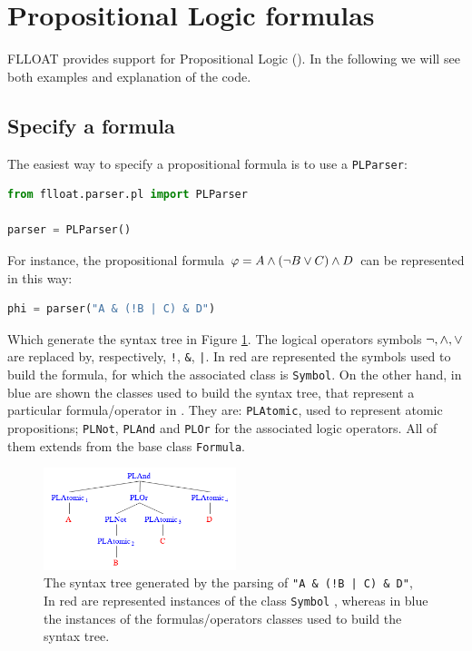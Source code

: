 \section{Propositional Logic formulas}\label{sect:flloat-pl}

FLLOAT provides support for Propositional Logic (\PL). In the following we will see both examples and explanation of the code.

\subsection{Specify a \PL formula}\label{sect:flloat-pl-syntax}
The easiest way to specify a propositional formula is to use a \texttt{PLParser}:

\begin{lstlisting}[language=Python, style=Python]
from flloat.parser.pl import PLParser

parser = PLParser()
\end{lstlisting}
For instance, the propositional formula $\varphi= A \wedge (\lnot B \vee C) \wedge D$ can be represented in this way:

\begin{lstlisting}[language=Python, style=Python]
phi = parser("A & (!B | C) & D")
\end{lstlisting}
Which generate the syntax tree in Figure \ref{fig:pl-formula-example-1-syntax-tree}. The logical operators symbols $\lnot, \wedge, \vee$ are replaced by, respectively, \texttt{!}, \texttt{\&}, \texttt{|}. In red are represented the symbols used to build the formula, for which the associated class is \texttt{Symbol}. On the other hand, in blue are shown the classes used to build the syntax tree, that represent a particular formula/operator in \PL. They are: \texttt{PLAtomic}, used to represent atomic propositions; \texttt{PLNot}, \texttt{PLAnd} and \texttt{PLOr} for the associated logic operators. All of them extends from the base class \texttt{Formula}.


\begin{figure}[h]
	\centering
	\includegraphics[width=0.5\textwidth]{images/pl-formula-example-1-syntax-tree}
	\caption{The syntax tree generated by the parsing of \texttt{"A \& (!B | C) \& D"}, In red are represented instances of the class \texttt{Symbol} , whereas in blue the instances of the formulas/operators classes used to build the syntax tree.}
	\label{fig:pl-formula-example-1-syntax-tree}
	
\end{figure}

